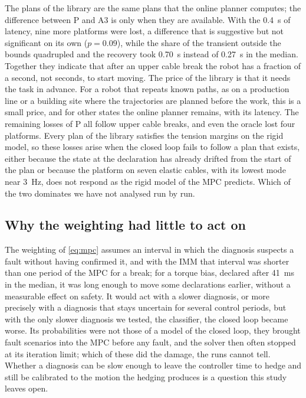 \documentclass[a4paper,fleqn]{cas-dc}
\begin{document}
The plans of the library are the same plans that the online planner computes; the difference between P and A3 is only when they are available. With the 0.4~s of latency, nine more platforms were lost, a difference that is suggestive but not significant on its own ($p=0.09$), while the share of the transient outside the bounds quadrupled and the recovery took 0.70~s instead of 0.27~s in the median. Together they indicate that after an upper cable break the robot has a fraction of a second, not seconds, to start moving. The price of the library is that it needs the task in advance. For a robot that repeats known paths, as on a production line or a building site where the trajectories are planned before the work, this is a small price, and for other states the online planner remains, with its latency. The remaining losses of P all follow upper cable breaks, and even the oracle lost four platforms. Every plan of the library satisfies the tension margins on the rigid model, so these losses arise when the closed loop fails to follow a plan that exists, either because the state at the declaration has already drifted from the start of the plan or because the platform on seven elastic cables, with its lowest mode near 3~Hz, does not respond as the rigid model of the MPC predicts. Which of the two dominates we have not analysed run by run.

\subsection{Why the weighting had little to act on}\label{sec:tighteningdiscussion}

The weighting of \eqref{eq:mpc} assumes an interval in which the diagnosis suspects a fault without having confirmed it, and with the IMM that interval was shorter than one period of the MPC for a break; for a torque bias, declared after 41~ms in the median, it was long enough to move some declarations earlier, without a measurable effect on safety. It would act with a slower diagnosis, or more precisely with a diagnosis that stays uncertain for several control periods, but with the only slower diagnosis we tested, the classifier, the closed loop became worse. Its probabilities were not those of a model of the closed loop, they brought fault scenarios into the MPC before any fault, and the solver then often stopped at its iteration limit; which of these did the damage, the runs cannot tell. Whether a diagnosis can be slow enough to leave the controller time to hedge and still be calibrated to the motion the hedging produces is a question this study leaves open.
\end{document}
